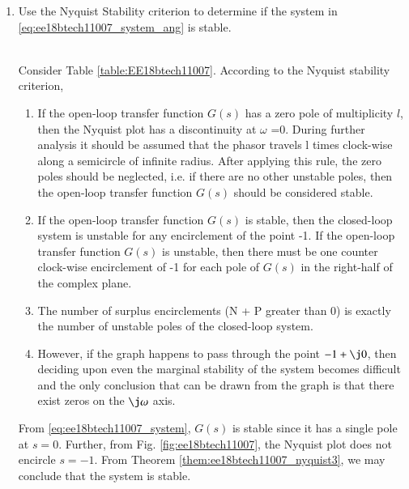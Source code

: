 \begin{enumerate}[label=\thesubsection.\arabic*.,ref=\thesubsection.\theenumi]
%
\item Use the Nyquist Stability criterion to determine if the system in \eqref{eq:ee18btech11007_system_ang} is stable.
\begin{table}[!ht]
\centering

\caption{}
\label{table:EE18btech11007}
\end{table}
\\
\solution Consider Table \ref{table:EE18btech11007}.  According to the Nyquist stability criterion, 
\begin{enumerate}
\item If the open-loop transfer function $G(s)$ has a zero pole of multiplicity $l$, then the Nyquist plot has a discontinuity at $\omega$ =0. During further analysis it should be assumed that the phasor travels l times clock-wise along a semicircle of infinite radius. After applying this rule, the zero poles should be neglected, i.e. if there are no other unstable poles, then the open-loop transfer function $G(s)$ should be considered stable.
\item If the open-loop transfer function $G(s)$ is stable, then the closed-loop system is unstable for any encirclement of the point -1.
If the open-loop transfer function $G(s)$ is unstable, then there must be one counter clock-wise encirclement of -1 for each pole of $G(s)$ in the right-half of the complex plane.
\label{them:ee18btech11007_nyquist3}
\item The number of surplus encirclements (N + P greater than 0) is exactly the number of unstable poles of the closed-loop system.
\item However, if the graph happens to pass through the point $-1+\j0$, then deciding upon even the marginal stability of the system becomes difficult and the only conclusion that can be drawn from the graph is that there exist zeros on the $\j \omega$  axis.
\end{enumerate}
From \eqref{eq:ee18btech11007_system}, $G(s)$ is stable since it has a single pole at $s = 0$.  Further,  from Fig.  \ref{fig:ee18btech11007}, the Nyquist plot does not encircle $s =  -1$.  From  Theorem \ref{them:ee18btech11007_nyquist3}, we may conclude that the system is stable.


\end{enumerate}

